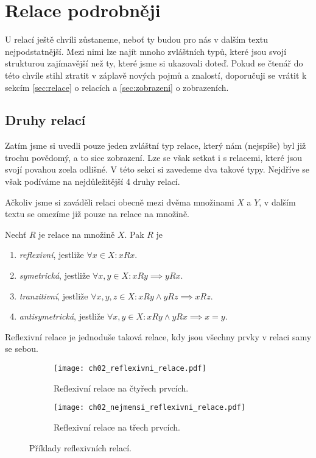 \section{Relace podrobněji}\label{sec:relace_podrobneji}
U relací ještě chvíli zůstaneme, neboť ty budou pro nás v dalším textu nejpodstatnější. Mezi nimi lze najít mnoho zvláštních typů, které jsou svojí strukturou zajímavější než ty, které jsme si ukazovali doteď. Pokud se čtenář do této chvíle stihl ztratit v záplavě nových pojmů a znalostí, doporučuji se vrátit k sekcím \ref{sec:relace} o relacích a \ref{sec:zobrazeni} o zobrazeních.

\subsection{Druhy relací}\label{subsec:druhy_relaci}
Zatím jsme si uvedli pouze jeden zvláštní typ relace, který nám (nejspíše) byl již trochu povědomý, a to sice zobrazení. Lze se však setkat i s relacemi, které jsou svojí povahou zcela odlišné. V této sekci si zavedeme dva takové typy. Nejdříve se však podíváme na nejdůležitější 4 druhy relací.\par
Ačkoliv jsme si zaváděli relaci obecně mezi dvěma množinami $X$ a $Y$, v dalším textu se omezíme již pouze na relace na množině.
\begin{definition}
    Nechť $R$ je relace na množině $X$. Pak $R$ je
    \begin{enumerate}[label=(\roman*)]
        \item \emph{reflexivní}, jestliže $\forall x\in X: xRx$.
        \item \emph{symetrická}, jestliže $\forall x,y\in X: xRy \implies yRx$.
        \item \emph{tranzitivní}, jestliže $\forall x,y,z\in X: xRy \land yRz \implies xRz$.
        \item \emph{antisymetrická}, jestliže $\forall x,y\in X: xRy \land yRx \implies x=y$.
    \end{enumerate}
\end{definition}
Reflexivní relace je jednoduše taková relace, kdy jsou všechny prvky v relaci samy se sebou.
\begin{figure}[H]
    \centering
    \begin{subfigure}{6cm}
        \centering
        \texttt{[image: ch02\_reflexivni\_relace.pdf]}
        \caption{Reflexivní relace na čtyřech prvcích.}
        \label{subfig:reflexivni_relace}
    \end{subfigure}
    \qquad
    \begin{subfigure}{6cm}
        \centering
        \texttt{[image: ch02\_nejmensi\_reflexivni\_relace.pdf]}
        \caption{Reflexivní relace na třech prvcích.}
        \label{subfig:nejmensi_reflexivni_relace}
    \end{subfigure}
    \caption{Příklady reflexivních relací.}
    \label{fig:priklady_reflexivnich_relaci}
\end{figure}
